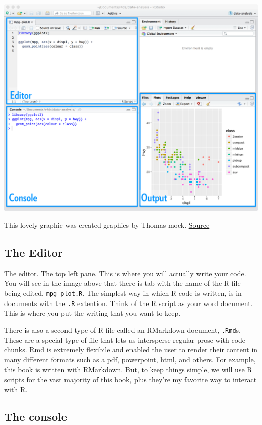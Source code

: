 \documentclass[
]{book}
\begin{document}
\includegraphics{static/rstudio-editor.png}

This lovely graphic was created graphics by Thomas mock. \href{https://github.com/jthomasmock/intro-tidyverse/blob/master/intro-to-tidyverse.rmd}{Source}

\hypertarget{the-editor}{%
\subsection{The Editor}\label{the-editor}}

The editor. The top left pane. This is where you will actually write your code. You will see in the image above that there is tab with the name of the R file being edited, \texttt{mpg-plot.R}. The simplest way in which R code is written, is in documents with the \texttt{.R} extention. Think of the R script as your word document. This is where you put the writing that you want to keep.

There is also a second type of R file called an RMarkdown document, \texttt{.Rmd}s. These are a special type of file that lets us intersperse regular prose with code chunks. Rmd is extremely flexibile and enabled the user to render their content in many different formats such as a pdf, powerpoint, html, and others. For example, this book is written with RMarkdown. But, to keep things simple, we will use R scripts for the vast majority of this book, plus they're my favorite way to interact with R.

\hypertarget{the-console}{%
\subsection{The console}\label{the-console}}
\end{document}
